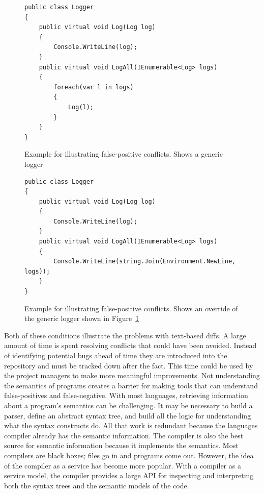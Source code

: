 \documentclass[draftclsnofoot,onecolumn]{IEEEtran}
\begin{document}
\begin{figure}[htb]
\centering
\begin{lstlisting}
public class Logger
{
    public virtual void Log(Log log)
    {
        Console.WriteLine(log);
    }
    public virtual void LogAll(IEnumerable<Log> logs)
    {
        foreach(var l in logs)
        {
            Log(l);
        }
    }
}
\end{lstlisting}
\caption{Example for illustrating false-positive conflicts. Shows a generic logger}
\label{example1}
\end{figure}

\begin{figure}[htb]
\centering
\begin{lstlisting}
public class Logger
{
    public virtual void Log(Log log)
    {
        Console.WriteLine(log);
    }
    public virtual void LogAll(IEnumerable<Log> logs)
    {
        Console.WriteLine(string.Join(Environment.NewLine, logs));
    }
}
\end{lstlisting}
\caption{Example for illustrating false-positive conflicts. Shows an override of the generic logger shown in Figure~\ref{example1}}
\label{example2}
\end{figure}

Both of these conditions illustrate the problems with text-based diffs. A large amount of time is spent resolving conflicts that could have been avoided. Instead of identifying potential bugs ahead of time they are introduced into the repository and must be tracked down after the fact. This time could be used by the project managers to make more meaningful improvements. Not understanding the semantics of programs creates a barrier for making tools that can understand false-positives and false-negative. With most languages, retrieving information about a program's semantics can be challenging. It may be necessary to build a parser, define an abstract syntax tree, and build all the logic for understanding what the syntax constructs do. All that work is redundant because the languages compiler already has the semantic information. The compiler is also the best source for semantic information because it implements the semantics. Most compilers are black boxes; files go in and programs come out. However, the idea of the compiler as a service has become more popular. With a compiler as a service model, the compiler provides a large API for inspecting and interpreting both the syntax trees and the semantic models of the code. 
\end{document}
